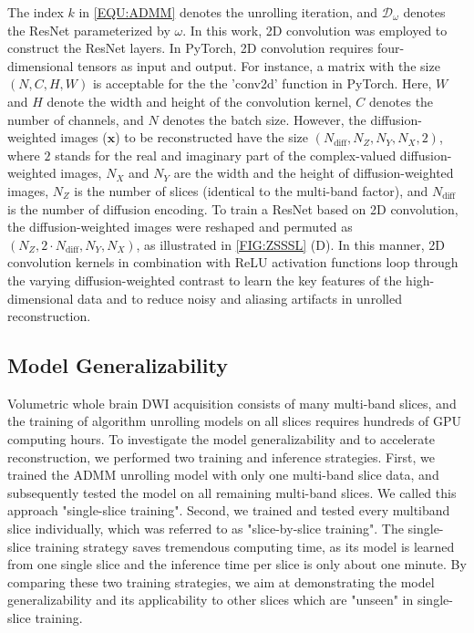 \documentclass[AMA,STIX2COL,Linenumberson]{MRM}
\begin{document}
The index $k$ in \cref{EQU:ADMM} denotes the unrolling iteration,
and $\mathcal{D}_{\omega}$ denotes the ResNet \cite{he_2016_resnet}
parameterized by $\omega$.
In this work, 2D convolution was employed to construct the ResNet layers.
In PyTorch, 2D convolution requires four-dimensional tensors as input and output.
For instance, a matrix with the size $(N, C, H, W)$ is acceptable
for the the 'conv2d' function in PyTorch.
Here, $W$ and $H$ denote the width and height of the convolution kernel,
$C$ denotes the number of channels, and $N$ denotes the batch size.
However, the diffusion-weighted images ($\mathbf{x}$) to be reconstructed
have the size $(N_{\text{diff}}, N_Z, N_Y, N_X, 2)$,
where $2$ stands for the real and imaginary part
of the complex-valued diffusion-weighted images,
$N_X$ and $N_Y$ are the width and the height of diffusion-weighted images,
$N_Z$ is the number of slices (identical to the multi-band factor), and
$N_{\text{diff}}$ is the number of diffusion encoding.
To train a ResNet based on 2D convolution,
the diffusion-weighted images were reshaped and permuted
as $(N_Z, 2 \cdot N_{\text{diff}}, N_Y, N_X)$, as illustrated in \cref{FIG:ZSSSL} (D).
In this manner, 2D convolution kernels in combination with ReLU activation functions
loop through the varying diffusion-weighted contrast
to learn the key features of the high-dimensional data and
to reduce noisy and aliasing artifacts in unrolled reconstruction.

\subsection{Model Generalizability} \label{SEC:ZSSSL_GEN}

Volumetric whole brain DWI acquisition consists of many multi-band slices,
and the training of algorithm unrolling models on all slices requires
hundreds of GPU computing hours.
To investigate the model generalizability and to accelerate reconstruction,
we performed two training and inference strategies.
First, we trained the ADMM unrolling model with only one multi-band slice data,
and subsequently tested the model on all remaining multi-band slices.
We called this approach "single-slice training".
Second, we trained and tested every multiband slice individually,
which was referred to as "slice-by-slice training".
The single-slice training strategy saves tremendous computing time,
as its model is learned from one single slice and
the inference time per slice is only about one minute.
By comparing these two training strategies,
we aim at demonstrating the model generalizability and
its applicability to other slices which are "unseen" in single-slice training.
\end{document}
